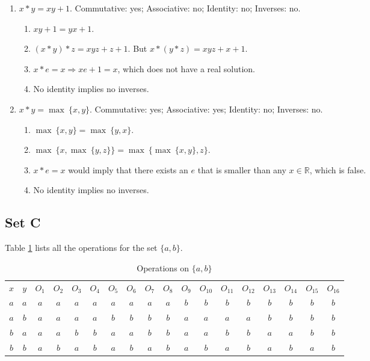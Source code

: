 \documentclass{article}
\begin{document}
\begin{enumerate}
\item $x * y = xy + 1$. Commutative: yes; Associative: no; Identity: no; Inverses: no.
\begin{enumerate}[label=(\roman*)]
    \item $xy + 1 = yx + 1$.
    \item $(x * y) * z = xyz + z + 1$. But $x * (y * z) = xyz + x + 1$.
    \item $x * e = x \Rightarrow xe + 1 = x$, which does not have a real solution.
    \item No identity implies no inverses.
\end{enumerate}

\item $x * y = \max\ \{x, y\}$. Commutative: yes; Associative: yes; Identity: no; Inverses: no.
\begin{enumerate}[label=(\roman*)]
    \item $\max\ \{x, y\} = \max\ \{y, x\}$.
    \item $\max\ \{x, \max\ \{y, z\}\} = \max\ \{\max\ \{x, y\}, z\}$.
    \item $x * e = x$ would imply that there exists an $e$ that is smaller than any $x \in \mathbb{R}$, which is false.
    \item No identity implies no inverses.
\end{enumerate}
\end{enumerate}

\subsection*{Set C}
Table \ref{tab:binary-operations} lists all the operations for the set $\{a, b\}$. 

\begin{table}[]
    \centering         
    \begin{tabular}{cc|cccccccccccccccc}
    $x$ & $y$ & $O_1$ & $O_2$ & $O_3$ & $O_4$ & $O_5$ & $O_6$ & $O_7$ & $O_8$ & $O_9$ & $O_{10}$ & $O_{11}$ & $O_{12}$ & $O_{13}$ & $O_{14}$ & $O_{15}$ & $O_{16}$ \\
    $a$ & $a$ & $a$     & $a$     & $a$     & $a$     & $a$     & $a$     & $a$     & $a$     & $b$     & $b$      & $b$      & $b$      & $b$      & $b$      & $b$      & $b$      \\
    $a$ & $b$ & $a$     & $a$     & $a$     & $a$     & $b$     & $b$     & $b$     & $b$     & $a$     & $a$      & $a$      & $a$      & $b$      & $b$      & $b$      & $b$      \\
    $b$ & $a$ & $a$     & $a$     & $b$     & $b$     & $a$     & $a$     & $b$     & $b$     & $a$     & $a$      & $b$      & $b$      & $a$      & $a$      & $b$      & $b$      \\
    $b$ & $b$ & $a$     & $b$     & $a$     & $b$     & $a$     & $b$     & $a$     & $b$     & $a$     & $b$      & $a$      & $b$      & $a$      & $b$      & $a$      & $b$     
    \end{tabular}
    \caption{Operations on $\{a, b\}$}
    \label{tab:binary-operations}
\end{table}
\end{document}
